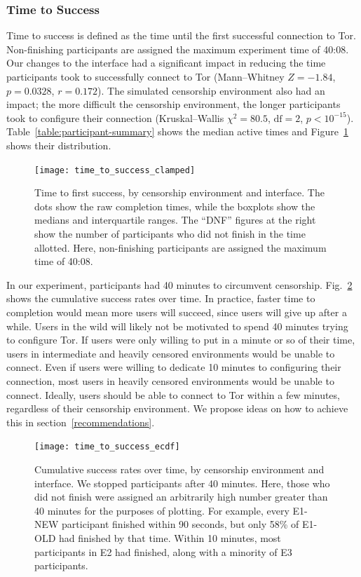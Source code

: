 \documentclass[USenglish,oneside,twocolumn]{article}
\begin{document}
\subsubsection{Time to Success} 
Time to success is defined as the time until the first successful connection to Tor. Non-finishing participants are assigned the maximum experiment time of 40:08.  Our changes to the interface had a significant impact in reducing the time participants took to successfully connect to Tor (Mann--Whitney $Z = -1.84$, $p = 0.0328$, $r= 0.172$). The simulated censorship environment also had an impact; the more difficult the censorship environment, the longer participants took to configure their connection (Kruskal--Wallis $\chi^2 = 80.5$, $\mbox{df} = 2$, $p < 10^{-15}$). 
Table~\ref{table:participant-summary} shows the median active times and Figure~\ref{fig:time_to_success_clamped} shows their distribution.

\begin{figure}[t]
\centering
\texttt{[image: time\_to\_success\_clamped]}
\caption{
Time to first success, by censorship environment and interface.
The dots show the raw completion times,
while the boxplots show the medians and interquartile ranges.
The ``DNF'' figures at the right show the number of participants 
who did not finish in the time allotted.
Here, non-finishing participants are assigned the maximum time of 40:08.
}
\label{fig:time_to_success_clamped}
\end{figure}

In our experiment, participants had 40 minutes to circumvent censorship. Fig.~\ref{fig:time_to_success_ecdf} shows the cumulative success rates over time. In practice, faster time to completion would mean more users will succeed, since users will give up after a while. Users in the wild will likely not be motivated to spend 40 minutes trying to configure Tor. If users were only willing to put in a minute or so of their time, users in intermediate and heavily censored environments would be unable to connect. Even if users were willing to dedicate 10 minutes to configuring their connection, most users in heavily censored environments would be unable to connect. Ideally, users should be able to connect to Tor within a few minutes, regardless of their censorship environment. We propose ideas on how to achieve this in section~\ref{recommendations}. 

\begin{figure}[t]
\centering
\texttt{[image: time\_to\_success\_ecdf]}

\caption{
Cumulative success rates over time, by censorship environment and interface.
We stopped participants after 40 minutes. Here, those who did not finish were assigned
an arbitrarily high number greater than 40 minutes for the purposes of plotting. 
For example, every E1-NEW participant finished within 90 seconds,
but only 58\% of E1-OLD had finished by that time. Within 10 minutes, most
participants in E2 had finished, along with a minority of E3 participants. 
}
\label{fig:time_to_success_ecdf}
\end{figure}
\end{document}
